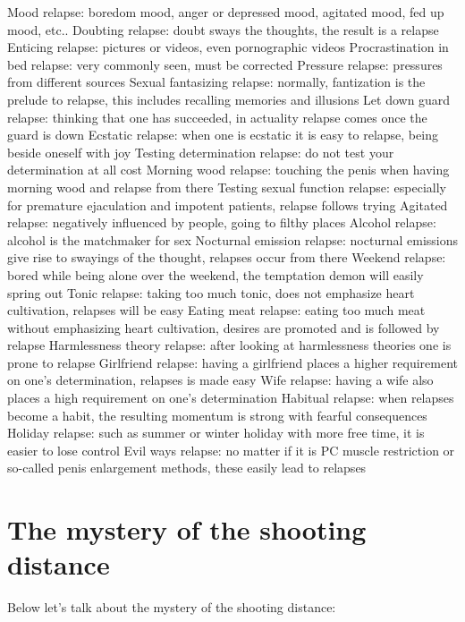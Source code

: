 \documentclass[
]{book}
\begin{document}
Mood relapse: boredom mood, anger or depressed mood, agitated mood, fed up mood, etc..
Doubting relapse: doubt sways the thoughts, the result is a relapse
Enticing relapse: pictures or videos, even pornographic videos
Procrastination in bed relapse: very commonly seen, must be corrected
Pressure relapse: pressures from different sources
Sexual fantasizing relapse: normally, fantization is the prelude to relapse, this includes recalling memories and illusions
Let down guard relapse: thinking that one has succeeded, in actuality relapse comes once the guard is down
Ecstatic relapse: when one is ecstatic it is easy to relapse, being beside oneself with joy
Testing determination relapse: do not test your determination at all cost
Morning wood relapse: touching the penis when having morning wood and relapse from there
Testing sexual function relapse: especially for premature ejaculation and impotent patients, relapse follows trying
Agitated relapse: negatively influenced by people, going to filthy places
Alcohol relapse: alcohol is the matchmaker for sex
Nocturnal emission relapse: nocturnal emissions give rise to swayings of the thought, relapses occur from there
Weekend relapse: bored while being alone over the weekend, the temptation demon will easily spring out
Tonic relapse: taking too much tonic, does not emphasize heart cultivation, relapses will be easy
Eating meat relapse: eating too much meat without emphasizing heart cultivation, desires are promoted and is followed by relapse
Harmlessness theory relapse: after looking at harmlessness theories one is prone to relapse
Girlfriend relapse: having a girlfriend places a higher requirement on one's determination, relapses is made easy
Wife relapse: having a wife also places a high requirement on one's determination
Habitual relapse: when relapses become a habit, the resulting momentum is strong with fearful consequences
Holiday relapse: such as summer or winter holiday with more free time, it is easier to lose control
Evil ways relapse: no matter if it is PC muscle restriction or so-called penis enlargement methods, these easily lead to relapses

\hypertarget{the-mystery-of-the-shooting-distance}{%
\section{The mystery of the shooting distance}\label{the-mystery-of-the-shooting-distance}}

Below let's talk about the mystery of the shooting distance:
\end{document}

